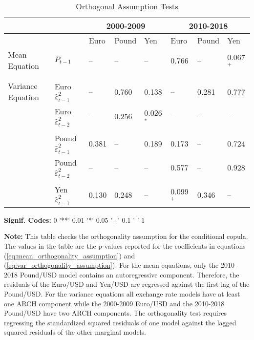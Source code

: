 \documentclass[12pt]{article}
\begin{document}
\begin{table}
	\fontsize{10pt}{10pt}\selectfont
	\centering
	\caption{Orthogonal Assumption Tests}
	\begin{tabular}{l l | l l l | l l l}
		\midrule
				& & \multicolumn{3}{c}{2000-2009} & \multicolumn{3}{c}{2010-2018} \\
		\midrule
				& & Euro & Pound & Yen & Euro & Pound & Yen \\
		\hline
        Mean Equation     & $P_{t-1}$                            & --    & --    & --          &  0.766       & --      & 0.067$^{+}$  \\ \\ \\
		Variance Equation & Euro $\hat{\varepsilon}^{2}_{t-1}$   & --    & 0.760 & 0.138       &  --          & 0.281   & 0.777        \\
                          & Euro $\hat{\varepsilon}^{2}_{t-2}$   & --    & 0.256 & 0.026$^{*}$ &  --          & --      & --           \\ \\
		                  & Pound $\hat{\varepsilon}^{2}_{t-1}$  & 0.381 & --    & 0.189       &  0.173       & --      & 0.724        \\
		                  & Pound $\hat{\varepsilon}^{2}_{t-2}$  & --    & --    & --          &  0.577       & --      & 0.928        \\ \\
                          & Yen $\hat{\varepsilon}^{2}_{t-1}$    & 0.130 & 0.248 & --          &  0.099$^{+}$ & 0.346   & --           \\
	\hline
	\end{tabular}
	\begin{tablenotes}
		\item{\footnotesize \textbf{Signif. Codes:} 0 '**' 0.01 '*' 0.05 '+' 0.1 ' ' 1}
		\item{\footnotesize \textbf{Note:} This table checks the orthogonality assumption for the conditional copula. The values in the table are the p-values reported for the coefficients in equations (\ref{eq:mean_orthogonality_assumption}) and (\ref{eq:var_orthogonality_assumption}). For the mean equations, only the 2010-2018 Pound/USD model contains an autoregressive component. Therefore, the residuals of the Euro/USD and Yen/USD are regressed against the first lag of the Pound/USD. For the variance equations all exchange rate models have at least one ARCH component while the 2000-2009 Euro/USD and the 2010-2018 Pound/USD have two ARCH components. The orthogonality test requires regressing the standardized squared residuals of one model against the lagged squared residuals of the other marginal models.}

\end{tablenotes}
\end{table}
\end{document}
